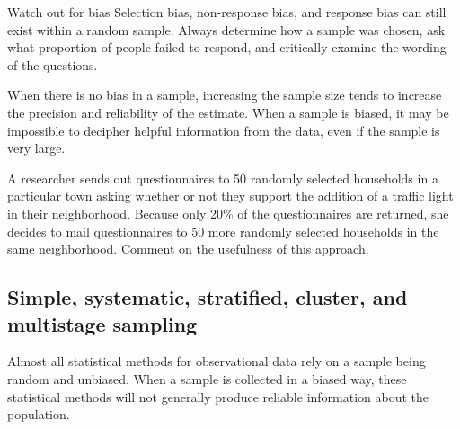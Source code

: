 \begin{onebox}{Watch out for bias}
Selection bias, non-response bias, and response bias can still exist within a random sample. Always determine how a sample was chosen, ask what proportion of people failed to respond, and critically examine the wording of the questions.
\end{onebox}

When there is no bias in a sample, increasing the sample size tends to increase the precision and reliability of the estimate. When a sample is biased, it may be impossible to decipher helpful information from the data, even if the sample is very large.

\textA{\pagebreak}

\begin{exercisewrap}
\begin{nexercise}
A researcher sends out questionnaires to 50 randomly selected households in a particular town asking whether or not they support the addition of a traffic light in their neighborhood. Because only 20\% of the questionnaires are returned, she decides to mail questionnaires to 50 more randomly selected households in the same neighborhood. Comment on the usefulness of this approach.\footnotemark
\end{nexercise}
\end{exercisewrap}




\subsection[Simple, systematic, stratified, cluster, and multistage sampling]{Simple, systematic, stratified, cluster, and multistage sampling}
\label{threeSamplingMethods}

Almost all statistical methods for observational data rely on a sample being random and unbiased. When a sample is collected in a biased way, these statistical methods will not generally produce reliable information about the population.

